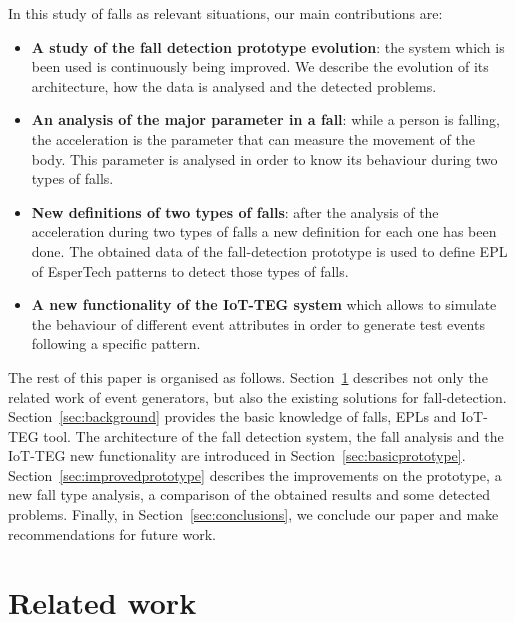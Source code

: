 \documentclass[journal]{IEEEtran}
\begin{document}
In this study of falls as relevant situations, our main contributions are:

\begin{itemize}
\item \textbf{A study of the fall detection prototype evolution}: the system which is been used is
 continuously being improved. We describe the evolution of its architecture, how the data is analysed and 
 the detected problems.
 \item \textbf{An analysis of the major parameter in a fall}: while a person is falling, the acceleration 
 is the parameter that can measure the movement of the body. This parameter is analysed in order to know 
 its behaviour during two types of falls.
 \item \textbf{New definitions of two types of falls}: after the analysis of the acceleration during two 
 types of falls a new definition for each one has been done. The obtained data of the fall-detection 
 prototype is used to define EPL of EsperTech patterns to detect those types of falls. 
 \item \textbf{A new functionality of the IoT-TEG system} which allows to simulate the behaviour of 
 different event attributes in order to generate test events following a specific pattern. 
\end{itemize}

The rest of this paper is organised as follows. Section~\ref{sec:relatedwork}
describes not only the related work of event generators, but also the existing
solutions for fall-detection. Section~\ref{sec:background} provides the basic
knowledge of falls, EPLs and IoT-TEG tool. The architecture
of the fall detection system, the fall analysis and the IoT-TEG new functionality are 
introduced in Section~\ref{sec:basicprototype}. Section~\ref{sec:improvedprototype}
describes the improvements on the prototype, a new fall type analysis,
a comparison of the obtained results and some detected problems. Finally, in Section~\ref{sec:conclusions}, 
we conclude our paper and make recommendations for future work.

\section{Related work}
\label{sec:relatedwork}
\end{document}
